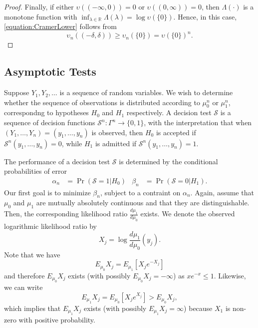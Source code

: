 \begin{proof}
Finally, if either $\upsilon ((-\infty, 0)) = 0$ or $\upsilon ((0, \infty)) = 0$, then $\Lambda(\cdot)$ is a monotone function with $\inf_{\lambda \in \mathbb{R}} \Lambda (\lambda) = \log \upsilon (\{ 0 \})$.
Hence, in this case, \eqref{equation:CramerLower} follows from
\begin{equation*}
\upsilon_n ((-\delta,\delta)) \geq \upsilon_n(\{0\}) = \upsilon (\{0\})^n .
\end{equation*}
\end{proof}

\newpage

\subsection{Asymptotic Tests}

Suppose $Y_1, Y_2, \ldots$ is a sequence of random variables.
We wish to determine whether the sequence of observations is distributed according to $\mu_0^n$ or $\mu_1^n$, correspondng to hypotheses $H_0$ and $H_1$ respectively.
A decision test $\mathcal{S}$ is a sequence of decision functions $\mathcal{S}^n : \Gamma^n \rightarrow \{ 0, 1 \}$, with the interpretation that when $(Y_1, \ldots, Y_n) = (y_1, \ldots, y_n)$ is observed, then $H_0$ is accepted if $\mathcal{S}^n (y_1, \ldots, y_n) = 0$, while $H_1$ is admitted if $\mathcal{S}^n (y_1, \ldots, y_n) = 1$.

The performance of a decision test $\mathcal{S}$ is determined by the conditional probabilities of error
\begin{align*}
\alpha_n &= \Pr (\mathcal{S} = 1 | H_0) &
\beta_n &= \Pr (\mathcal{S} = 0 | H_1) .
\end{align*}
Our first goal is to minimize $\beta_n$, subject to a contraint on $\alpha_n$.
Again, assume that $\mu_0$ and $\mu_1$ are mutually absolutely continuous and that they are distinguishable.
Then, the corresponding likelihood ratio $\frac{d\mu_1}{d\mu_0}$ exists.
We denote the observed logarithmic likelihood ratio by
\begin{equation*}
X_j = \log \frac{d \mu_1}{d \mu_0} (y_j) .
\end{equation*}
Note that we have
\begin{equation*}
E_{\mu_0} X_j = E_{\mu_1} \left[ X_j e^{- X_j} \right]
\end{equation*}
and therefore $E_{\mu_0} X_j$ exists (with possibly $E_{\mu_0} X_j = - \infty$) as $xe^{-x} \leq 1$.
Likewise, we can write
\begin{equation*}
E_{\mu_1} X_j = E_{\mu_0} \left[ X_j e^{X_j} \right] > E_{\mu_0} X_j ,
\end{equation*}
which implies that $E_{\mu_1} X_j$ exists (with possibly $E_{\mu_1} X_j = \infty$) because $X_1$ is non-zero with positive probability.


